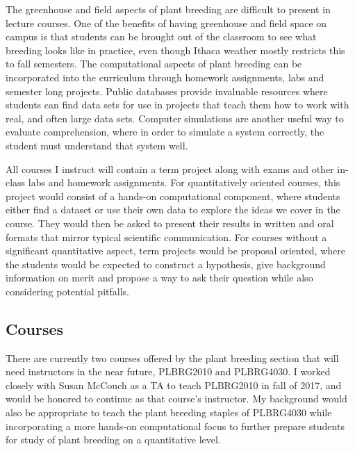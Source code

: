 \documentclass[10pt]{article}
\begin{document}
The greenhouse and field aspects of plant breeding are difficult to present in lecture courses. One of the benefits of having greenhouse and field space on campus is that students can be brought out of the classroom to see what breeding looks like in practice, even though Ithaca weather mostly restricts this to fall semesters. The computational aspects of plant breeding can be incorporated into the curriculum through homework assignments, labs and semester long projects. Public databases provide invaluable resources where students can find data sets for use in projects that teach them how to work with real, and often large data sets. Computer simulations are another useful way to evaluate comprehension, where in order to simulate a system correctly, the student must understand that system well.

All courses I instruct will contain a term project along with exams and other in-class labs and homework assignments. For quantitatively oriented courses, this project would consist of a hands-on computational component, where students either find a dataset or use their own data to explore the ideas we cover in the course. They would then be asked to present their results in written and oral formats that mirror typical scientific communication. For courses without a significant quantitative aspect, term projects would be proposal oriented, where the students would be expected to construct a hypothesis, give background information on merit and propose a way to ask their question while also considering potential pitfalls. %


\subsection*{Courses}

There are currently two courses offered by the plant breeding section that will need instructors in the near future, PLBRG2010 and PLBRG4030. I worked closely with Susan McCouch as a TA to teach PLBRG2010 in fall of 2017, and would be honored to continue as that course's instructor. My background would also be appropriate to teach the plant breeding staples of PLBRG4030 while incorporating a more hands-on computational focus to further prepare students for study of plant breeding on a quantitative level. 
\end{document}
